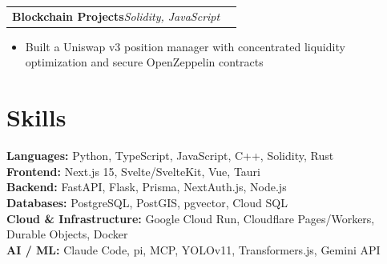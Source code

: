\documentclass[letterpaper,11pt]{article}
\makeatletter
\newenvironment{bullets}{\small\begin{itemize}}{\end{itemize}\vspace{1pt}}
\newcommand{\sep}{\enspace\textbar\enspace}
\newcommand{\project}[3]{%
  \begin{tabular*}{\linewidth}{@{}l@{\extracolsep{\fill}}r@{}}
    \textbf{#1}\sep\textit{\small #2} & {\small #3} \\
  \end{tabular*}\par}
\makeatother
\begin{document}
\project{Blockchain Projects}{Solidity, JavaScript}{}
\begin{bullets}
  \item Built a Uniswap v3 position manager with concentrated liquidity optimization and secure OpenZeppelin contracts
\end{bullets}

\section{Skills}
{\small
  \textbf{Languages:} Python, TypeScript, JavaScript, C++, Solidity, Rust \\
  \textbf{Frontend:} Next.js 15, Svelte/SvelteKit, Vue, Tauri \\
  \textbf{Backend:} FastAPI, Flask, Prisma, NextAuth.js, Node.js \\
  \textbf{Databases:} PostgreSQL, PostGIS, pgvector, Cloud SQL \\
  \textbf{Cloud \& Infrastructure:} Google Cloud Run, Cloudflare Pages/Workers, Durable Objects, Docker \\
  \textbf{AI / ML:} Claude Code, pi, MCP, YOLOv11, Transformers.js, Gemini API\par}
\end{document}
